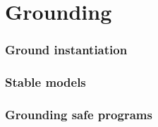 \part{Grounding}
\section{Ground instantiation}


\section{Stable models}

\section{Grounding safe programs}

%
